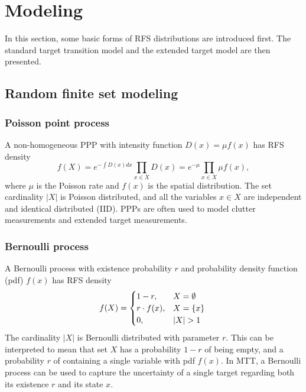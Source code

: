 \section{Modeling}
In this section, some basic forms of RFS distributions are introduced first. The standard target transition model and the extended target model are then presented. 

\subsection{Random finite set modeling}
\subsubsection{Poisson point process}
A non-homogeneous PPP
with intensity function $D(x)=\mu f(x)$ has RFS density \cite{pmbmextended2}
\begin{equation}
    f(X) = e^{-\int D(x)dx}\prod_{x\in X}D(x)=e^{-\mu}\prod_{x\in X}\mu f(x),
    \label{eq:poisson}
\end{equation}
where $\mu$ is the Poisson rate and $f(x)$ is the spatial distribution. The set cardinality $|X|$ is Poisson distributed, and all the variables $x\in X$ are independent and identical distributed (IID). PPPs are often used to model clutter measurements and extended target measurements.

\subsubsection{Bernoulli process}
A Bernoulli process with existence probability $r$ and probability density function (pdf) $f(x)$ has RFS density
\begin{equation}
f(X) = 
\begin{cases}
    1-r,& X=\emptyset\\
    r\cdot f(x),& X=\{x\}\\
    0,& |X| > 1
\end{cases}
\label{eq:bernoulli}\\
\end{equation}
The cardinality $|X|$ is Bernoulli distributed with parameter $r$. This can be interpreted to mean that set $X$ has a probability $1-r$ of being empty, and a probability $r$ of containing a single variable with pdf $f(x)$. In MTT, a Bernoulli process can be used to capture the uncertainty of a single target regarding both its existence $r$ and its state $x$. 

